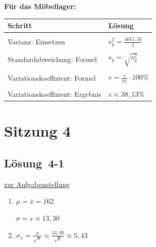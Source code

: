 \documentclass[
  11pt,
  ngerman,
  a4paper,
]{report}
\begin{document}
\textbf{Für das Möbellager:}

\begin{table}[H]
\centering
\begin{tabular}{>{\raggedright\arraybackslash}p{8cm}>{\raggedright\arraybackslash}p{8cm}}
\toprule
\textbf{Schritt} & \textbf{Lösung}\\
\midrule
\cellcolor{gray!6}{Varianz: Formel} & \cellcolor{gray!6}{$s^2=\frac{\sum\limits_{i=1}^{n}(x_{i}-\bar{x})^2}{n-1}$}\\
Varianz: Einsetzen & $s^2_y=\frac{4015{,}33}{5}$\\
\cellcolor{gray!6}{Varianz: Ergebnis} & \cellcolor{gray!6}{$s^2_y=803{,}07$}\\
Standardabweichung: Formel & $s_y=\sqrt{s^2_y}$\\
\cellcolor{gray!6}{Standardabweichung: Ergebnis} & \cellcolor{gray!6}{$s_y\approx28{,}34$}\\
Variationskoeffizient: Formel & $v=\frac{s}{|\bar{x}|}\cdot100\%$\\
\cellcolor{gray!6}{Variationskoeffizient: Einsetzen} & \cellcolor{gray!6}{$v\approx\frac{28{,}34}{74{,}33}\cdot100\%$}\\
Variationskoeffizient: Ergebnis & $v \approx 38{,}13\%$\\
\bottomrule
\end{tabular}
\end{table}

\hypertarget{sitzung-4}{%
\section*{Sitzung 4}\label{sitzung-4}}

\hypertarget{loesung-4-1}{%
\subsection{Lösung~4-1}\label{loesung-4-1}}

\protect\hyperlink{aufgabe-4-1}{zur Aufgabenstellung}

\begin{enumerate}
\def\labelenumi{\alph{enumi})}
\item
  \(\mu = \bar{x} = 162\)

  \(\sigma = s \approx 13{,}30\)
\item
  \(\sigma_{\bar{x}} = \frac{\sigma}{\sqrt{n}}\approx\frac{13{,}30}{\sqrt{6}} \approx 5,43\)
\end{enumerate}
\end{document}
